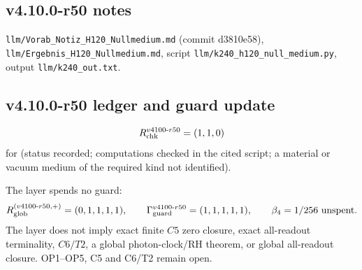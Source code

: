 \subsection*{v4.10.0-r50 notes}
\label{subsec:v4100-r50-notes}

\texttt{llm/\allowbreak Vorab\_\allowbreak Notiz\_\allowbreak H120\_\allowbreak Nullmedium.md} (commit d3810e58), \texttt{llm/\allowbreak Ergebnis\_\allowbreak H120\_\allowbreak Nullmedium.md},
script \texttt{llm/\allowbreak k240\_\allowbreak h120\_\allowbreak null\_\allowbreak medium.py}, output \texttt{llm/\allowbreak k240\_\allowbreak out.txt}.

\subsection*{v4.10.0-r50 ledger and guard update}
\label{subsec:v4100-r50-ledger-guard}

\[
R_{\rm chk}^{v4100\text{-}r50}=(1,1,0)
\]
for (status recorded; computations checked in the cited script; a material or vacuum medium of the required kind not identified).

The layer spends no guard:
\[
R_{\rm glob}^{(v4100\text{-}r50,+)}=(0,1,1,1,1),
\qquad
\Gamma_{\rm guard}^{v4100\text{-}r50}=(1,1,1,1,1),
\qquad
\beta_4=1/256\ \text{unspent}.
\]
The layer does not imply exact finite \(C5\) zero closure, exact all-readout terminality, \(C6/T2\), a global photon-clock/RH theorem,
or global all-readout closure.  OP1--OP5, C5 and C6/T2 remain open.
